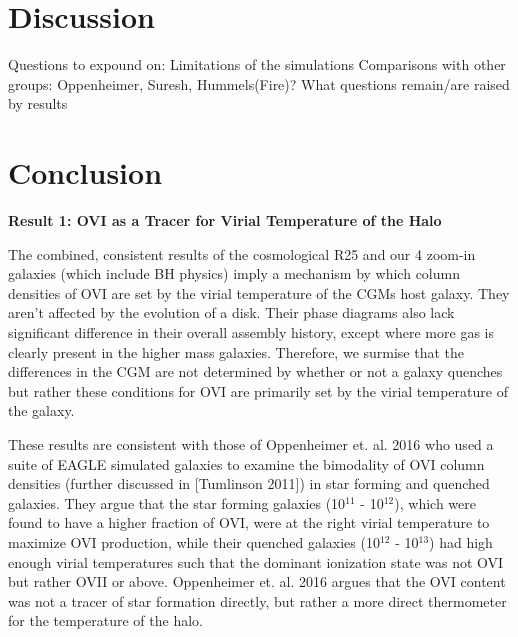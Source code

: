 \documentclass[]{emulateapj}
\begin{document}

\section{Discussion} 
\label{Discuss}

Questions to expound on:
Limitations of the simulations
Comparisons with other groups: Oppenheimer, Suresh, Hummels(Fire)?
What questions remain/are raised by results 





\section{Conclusion}
\textbf{Result 1: OVI as a Tracer for Virial Temperature of the Halo}

The combined, consistent results of the cosmological R25 and our 4 zoom-in galaxies (which include BH physics) imply a mechanism by which column densities of OVI are set by the virial temperature of the CGMs host galaxy. They aren't affected by the evolution of a disk. Their phase diagrams also lack significant difference in their overall assembly history, except where more gas is clearly present in the higher mass galaxies. Therefore, we surmise that the differences in the CGM are not determined by whether or not a galaxy quenches but rather these conditions for OVI are primarily set by the virial temperature of the galaxy. 

These results are consistent with those of Oppenheimer et. al. 2016 who used a suite of EAGLE simulated galaxies to examine the bimodality of OVI column densities (further discussed in [Tumlinson 2011]) in star forming and quenched galaxies. They argue that the star forming galaxies (10$^{11}$ - 10$^{12}$), which were found to have a higher fraction of OVI, were at the right virial temperature to maximize OVI production, while their quenched galaxies (10$^{12}$ - 10$^{13}$) had high enough virial temperatures such that the dominant ionization state was not OVI but rather OVII or above. Oppenheimer et. al. 2016 argues that the OVI content was not a tracer of star formation directly, but rather a more direct thermometer for the temperature of the halo.
\end{document}
